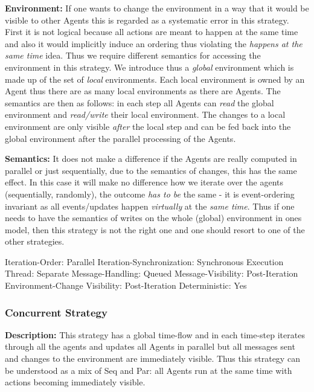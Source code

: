 \textbf{Environment:} If one wants to change the environment in a way that it would be visible to other Agents this is regarded as a systematic error in this strategy. First it is not logical because all actions are meant to happen at the same time and also it would implicitly induce an ordering thus violating the \textit{happens at the same time} idea. Thus we require different semantics for accessing the environment in this strategy. We introduce thus a \textit{global} environment which is made up of the set of \textit{local} environments. Each local environment is owned by an Agent thus there are as many local environments as there are Agents. The semantics are then as follows: in each step all Agents can \textit{read} the global environment and \textit{read/write} their local environment. The changes to a local environment are only visible \textit{after} the local step and can be fed back into the global environment after the parallel processing of the Agents.

\textbf{Semantics:} It does not make a difference if the Agents are really computed in parallel or just sequentially, due to the semantics of changes, this has the same effect. In this case it will make no difference how we iterate over the agents (sequentially, randomly), the outcome \textit{has to be} the same - it is event-ordering invariant as all events/updates happen \textit{virtually} at the \textit{same time}. Thus if one needs to have the semantics of writes on the whole (global) environment in ones model, then this strategy is not the right one and one should resort to one of the other strategies.

	Iteration-Order:			Parallel
	Iteration-Synchronization: 	Synchronous
	Execution Thread:			Separate
 	Message-Handling:			Queued
 	Message-Visibility:			Post-Iteration
 	Environment-Change Visibility:		Post-Iteration
 	Deterministic:				Yes
 	
\subsubsection{Concurrent Strategy}
\textbf{Description:} This strategy has a global time-flow and in each time-step iterates through all the agents and updates all Agents in parallel but all messages sent and changes to the environment are immediately visible. Thus this strategy can be understood as a mix of Seq and Par: all Agents run at the same time with actions becoming immediately visible.

